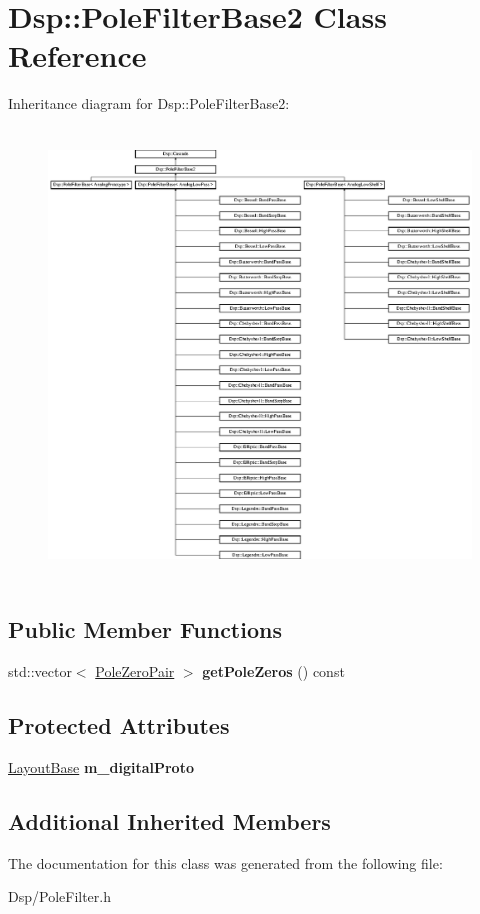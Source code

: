 \hypertarget{classDsp_1_1PoleFilterBase2}{\section{Dsp\-:\-:Pole\-Filter\-Base2 Class Reference}
\label{classDsp_1_1PoleFilterBase2}
}
Inheritance diagram for Dsp\-:\-:Pole\-Filter\-Base2\-:\begin{figure}[H]
\begin{center}
\leavevmode
\includegraphics[height=12.000000cm]{classDsp_1_1PoleFilterBase2}
\end{center}
\end{figure}
\subsection*{Public Member Functions}
\begin{DoxyCompactItemize}
\item 
\hypertarget{classDsp_1_1PoleFilterBase2_ac7e7ecd16dda10e80c56e918d18b4b6a}{std\-::vector$<$ \hyperlink{structDsp_1_1PoleZeroPair}{Pole\-Zero\-Pair} $>$ {\bfseries get\-Pole\-Zeros} () const }\label{classDsp_1_1PoleFilterBase2_ac7e7ecd16dda10e80c56e918d18b4b6a}

\end{DoxyCompactItemize}
\subsection*{Protected Attributes}
\begin{DoxyCompactItemize}
\item 
\hypertarget{classDsp_1_1PoleFilterBase2_ad4bc3071f0f428c71dd1f99a967d3145}{\hyperlink{classDsp_1_1LayoutBase}{Layout\-Base} {\bfseries m\-\_\-digital\-Proto}}\label{classDsp_1_1PoleFilterBase2_ad4bc3071f0f428c71dd1f99a967d3145}

\end{DoxyCompactItemize}
\subsection*{Additional Inherited Members}


The documentation for this class was generated from the following file\-:\begin{DoxyCompactItemize}
\item 
Dsp/Pole\-Filter.\-h\end{DoxyCompactItemize}
